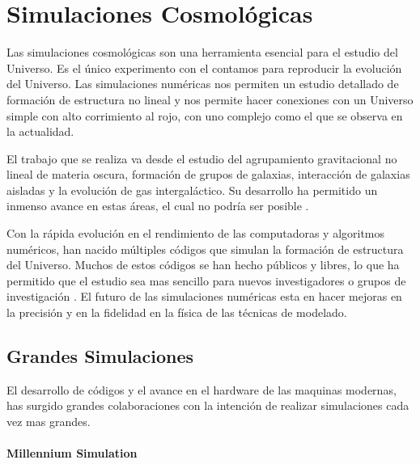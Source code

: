 
\chapter{Simulaciones Cosmológicas}
\label{chap:2 Sim}
\setcounter{equation}{0}

Las simulaciones cosmológicas son una herramienta esencial para el estudio del Universo. Es el único experimento con el contamos para reproducir la evolución del Universo. Las simulaciones numéricas nos permiten un estudio detallado de formación de estructura no lineal y nos permite hacer conexiones con un Universo simple con alto corrimiento al rojo, con uno complejo como el que se observa en la actualidad.

El trabajo que se realiza va desde el estudio del agrupamiento gravitacional no lineal de materia oscura, formación de grupos de galaxias, interacción de galaxias aisladas y la evolución de gas intergaláctico. Su desarrollo ha permitido un inmenso avance en estas áreas, el cual no podría ser posible  \cite{2001NewA....6...79S}.


Con la rápida evolución en el rendimiento de las computadoras y algoritmos numéricos, han nacido múltiples códigos que simulan la formación de estructura del Universo. Muchos de estos códigos se han hecho públicos y libres, lo que ha permitido que el estudio sea mas sencillo para nuevos investigadores o grupos de investigación \cite{2021MNRAS.506.2871S}. El futuro de las simulaciones numéricas esta en hacer mejoras en la precisión y en la fidelidad en la física de las técnicas de modelado.


\section{Grandes Simulaciones}

El desarrollo de códigos y el avance en el hardware de las maquinas modernas, has surgido grandes colaboraciones con la intención de realizar simulaciones cada vez mas grandes.

\subsubsection{Millennium Simulation}

